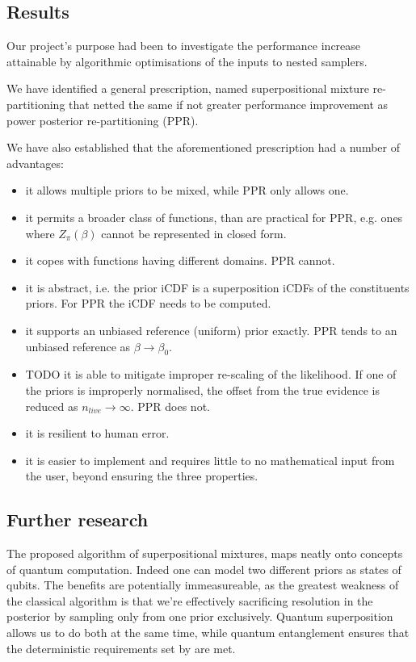\documentclass[usenatbib]{mnras}
\begin{document}
\subsection{Results}
\label{sec:org124e9fd}
Our project's purpose had been to investigate the performance
increase attainable by algorithmic optimisations of the inputs to
nested samplers. 

We have identified a general prescription, named superpositional
mixture re-partitioning that netted the same if not greater
performance improvement as power posterior re-partitioning (PPR). 

We have also established that the aforementioned prescription had a
number of advantages:
\begin{itemize}
\item it allows multiple priors to be mixed, while PPR only allows one.
\item it permits a broader class of functions, than are practical for
PPR, e.g. ones where \(Z_{\pi}(\beta)\) cannot be represented in
closed form.
\item it copes with functions having different domains. PPR cannot.
\item it is abstract, i.e. the prior iCDF is a superposition iCDFs of
the constituents priors. For PPR the iCDF needs to be computed.
\item it supports an unbiased reference (uniform) prior exactly. PPR
tends to an unbiased reference as \(\beta\rightarrow\beta_{0}\).
\item TODO it is able to mitigate improper re-scaling of the
likelihood. If one of the priors is improperly normalised, the
offset from the true evidence is reduced as
\(n_{live}\rightarrow\infty\). PPR does not.
\item it is resilient to human error.
\item it is easier to implement and requires little to no mathematical
input from the user, beyond ensuring the three properties.
\end{itemize}


\subsection{Further research}
\label{sec:org929f95e}
The proposed algorithm of superpositional mixtures, maps neatly
onto concepts of quantum computation. Indeed one can model two
different priors as states of qubits. The benefits are potentially
immeasureable, as the greatest weakness of the classical algorithm
is that we're effectively sacrificing resolution in the posterior
by sampling only from one prior exclusively. Quantum superposition
allows us to do both at the same time, while quantum entanglement
ensures that the deterministic requirements set by
\citeauthor{skilling2006} are met.
\end{document}

